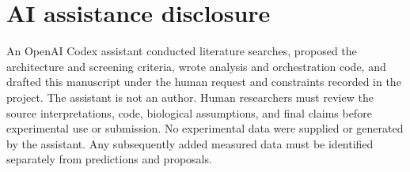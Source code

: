 \documentclass{article}
\begin{document}


\section{AI assistance disclosure}
An OpenAI Codex assistant conducted literature searches, proposed the
architecture and screening criteria, wrote analysis and orchestration code,
and drafted this manuscript under the human request and constraints recorded
in the project. The assistant is not an author. Human researchers must review
the source interpretations, code, biological assumptions, and final claims
before experimental use or submission. No experimental data were supplied or
generated by the assistant. Any subsequently added measured data must be
identified separately from predictions and proposals.
\end{document}
